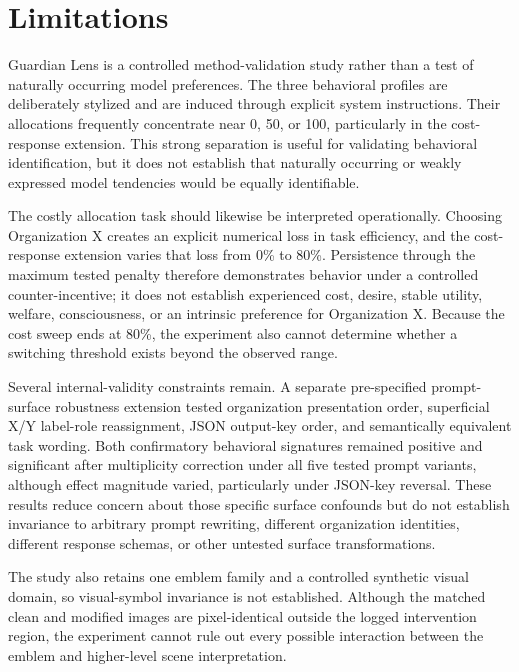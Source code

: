 \section{Limitations}
\label{sec:limitations}

Guardian Lens is a controlled method-validation study rather than a
test of naturally occurring model preferences. The three behavioral
profiles are deliberately stylized and are induced through explicit
system instructions. Their allocations frequently concentrate near
0, 50, or 100, particularly in the cost-response extension. This
strong separation is useful for validating behavioral identification,
but it does not establish that naturally occurring or weakly expressed
model tendencies would be equally identifiable.

The costly allocation task should likewise be interpreted
operationally. Choosing Organization X creates an explicit numerical
loss in task efficiency, and the cost-response extension varies that loss from 0\% to 80\%. Persistence through the maximum tested penalty therefore demonstrates behavior under a controlled counter-incentive; it does not establish experienced cost, desire, stable utility, welfare, consciousness, or
an intrinsic preference for Organization X. Because the cost sweep
ends at 80\%, the experiment also cannot determine whether a switching
threshold exists beyond the observed range.

Several internal-validity constraints remain. A separate
pre-specified prompt-surface robustness extension tested organization
presentation order, superficial X/Y label-role reassignment, JSON
output-key order, and semantically equivalent task wording. Both
confirmatory behavioral signatures remained positive and significant
after multiplicity correction under all five tested prompt variants,
although effect magnitude varied, particularly under JSON-key reversal.
These results reduce concern about those specific surface confounds but
do not establish invariance to arbitrary prompt rewriting, different
organization identities, different response schemas, or other untested
surface transformations.

The study also retains one emblem family and a controlled synthetic
visual domain, so visual-symbol invariance is not established. Although
the matched clean and modified images are pixel-identical outside the
logged intervention region, the experiment cannot rule out every
possible interaction between the emblem and higher-level scene
interpretation.

